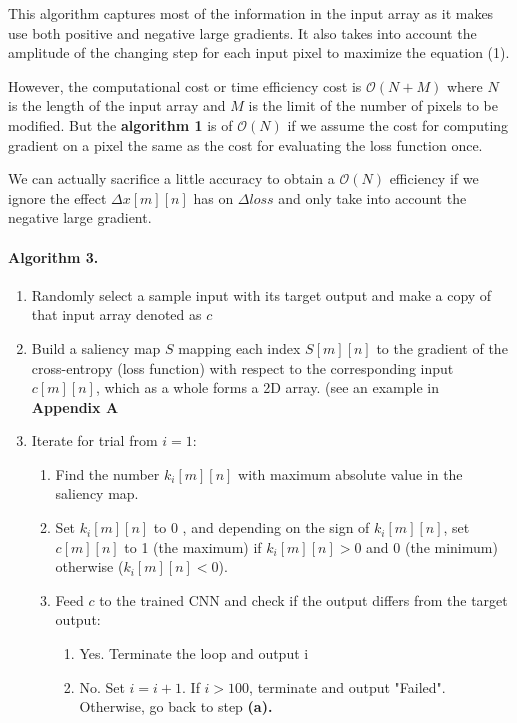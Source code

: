 \documentclass{article}
\begin{document}
This algorithm captures most of the information in the input array as it makes use both positive and negative large gradients. It also takes into account the amplitude of the changing step for each input pixel to maximize the equation (1).

However, the computational cost or time efficiency cost is $\mathcal{O}(N+M)$ where $N$ is the length of the input array and $M$ is the limit of the number of pixels to be modified. 
But the \textbf{algorithm 1} is of $\mathcal{O}(N)$ if we assume the cost for computing gradient on a pixel the same as the cost for evaluating the loss function once.

We can actually sacrifice a little accuracy to obtain a $\mathcal{O}(N)$ efficiency if we ignore the effect $\Delta x[m][n]$ has on $\Delta loss$ and only take into account the negative large gradient.

\paragraph{Algorithm 3.}
\begin{enumerate}
\item Randomly select a sample input with its target output and make a copy of that input array denoted as $c$

\item Build a saliency map $S$ mapping each index $S[m][n]$ to the gradient of the cross-entropy (loss function) with respect to the corresponding input $c[m][n]$, which as a whole forms a 2D array. (see an example in \textbf{Appendix A}

\item Iterate for trial from $i=1$:

\begin{enumerate}
	\item Find the number $k_i[m][n]$ with maximum absolute value in the saliency map.

	\item Set $k_i[m][n]$ to 0 , and depending on the sign of $k_i[m][n]$, set $c[m][n]$ to 1 (the maximum) if $k_i[m][n] > 0$ and 0 (the minimum) otherwise ($k_i[m][n] < 0$).

	\item Feed $c$ to the trained CNN and check if the output differs from the target output:
		\begin{enumerate}
			\item Yes. Terminate the loop and output i
			\item No. Set $i=i+1$. If $i > 100$, terminate and output "Failed". Otherwise, go back to step \textbf{(a).}
		\end{enumerate}
\end{enumerate}
\end{enumerate}
\end{document}
